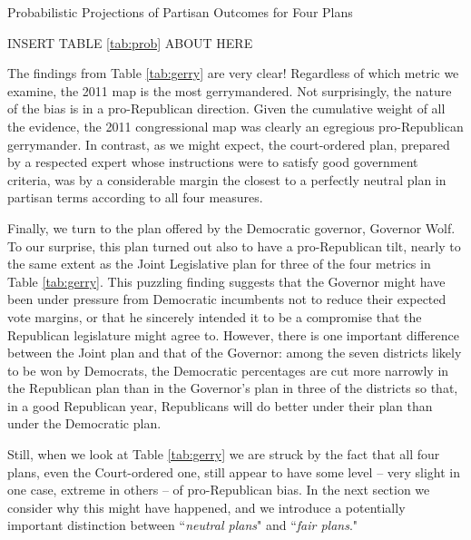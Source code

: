 \begin{center} Probabilistic Projections of Partisan Outcomes for Four Plans \end{center}
%
\begin{center} INSERT TABLE \ref{tab:prob} ABOUT HERE \end{center}
\par
    The findings from Table \ref{tab:gerry} are very clear! Regardless of which metric we examine, the 2011 map is the most gerrymandered. Not surprisingly, the nature of the bias is in a pro-Republican direction. Given the cumulative weight of all the evidence, the 2011 congressional map was clearly an egregious pro-Republican gerrymander. In contrast, as we might expect, the court-ordered plan, prepared by a respected expert whose instructions were to satisfy good government criteria, was by a considerable margin the closest to a perfectly neutral plan in partisan terms according to all four measures. 
\par
    Finally, we turn to the plan offered by the Democratic governor, Governor Wolf. To our surprise, this plan turned out also to have a pro-Republican tilt, nearly to the same extent as the Joint Legislative plan for three of the four metrics in Table \ref{tab:gerry}. This puzzling finding suggests that the Governor might have been under pressure from Democratic incumbents not to reduce their expected vote margins, or that he sincerely intended it to be a compromise that the Republican legislature might agree to. However, there is one important difference between the Joint plan and that of the Governor: among the seven districts likely to be won by Democrats, the Democratic percentages are cut more narrowly in the Republican plan than in the Governor’s plan in three of the districts so that, in a good Republican year, Republicans will do better under their plan than under the Democratic plan.
\par
    Still, when we look at Table \ref{tab:gerry} we are struck by the fact that all four plans, even the Court-ordered one, still appear to have some level -- very slight in one case, extreme in others -- of pro-Republican bias. In the next section we consider why this might have happened, and we introduce a potentially important distinction between ``\textit{neutral plans}" and ``\textit{fair plans}."
